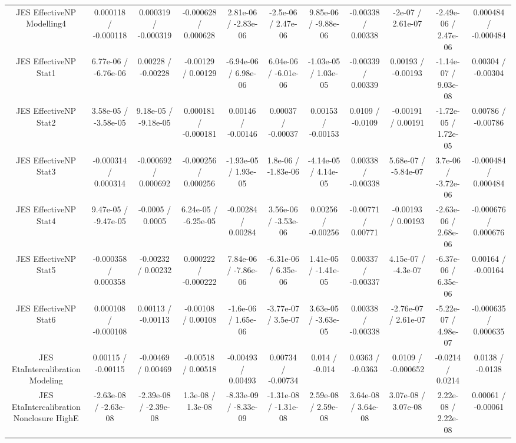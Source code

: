 \begin{table}[htbp]
\begin{center}
\begin{tabular}{|c|c|c|c|c|c|c|c|c|c|c|}
  JES EffectiveNP Modelling4 & 0.000118 / -0.000118 & 0.000319 / -0.000319 & -0.000628 / 0.000628 & 2.81e-06 / -2.83e-06 & -2.5e-06 / 2.47e-06 & 9.85e-06 / -9.88e-06 & -0.00338 / 0.00338 & -2e-07 / 2.61e-07 & -2.49e-06 / 2.47e-06 & 0.000484 / -0.000484 \\ 
  JES EffectiveNP Stat1 & 6.77e-06 / -6.76e-06 & 0.00228 / -0.00228 & -0.00129 / 0.00129 & -6.94e-06 / 6.98e-06 & 6.04e-06 / -6.01e-06 & -1.03e-05 / 1.03e-05 & -0.00339 / 0.00339 & 0.00193 / -0.00193 & -1.14e-07 / 9.03e-08 & 0.00304 / -0.00304 \\ 
  JES EffectiveNP Stat2 & 3.58e-05 / -3.58e-05 & 9.18e-05 / -9.18e-05 & 0.000181 / -0.000181 & 0.00146 / -0.00146 & 0.00037 / -0.00037 & 0.00153 / -0.00153 & 0.0109 / -0.0109 & -0.00191 / 0.00191 & -1.72e-05 / 1.72e-05 & 0.00786 / -0.00786 \\ 
  JES EffectiveNP Stat3 & -0.000314 / 0.000314 & -0.000692 / 0.000692 & -0.000256 / 0.000256 & -1.93e-05 / 1.93e-05 & 1.8e-06 / -1.83e-06 & -4.14e-05 / 4.14e-05 & 0.00338 / -0.00338 & 5.68e-07 / -5.84e-07 & 3.7e-06 / -3.72e-06 & -0.000484 / 0.000484 \\ 
  JES EffectiveNP Stat4 & 9.47e-05 / -9.47e-05 & -0.0005 / 0.0005 & 6.24e-05 / -6.25e-05 & -0.00284 / 0.00284 & 3.56e-06 / -3.53e-06 & 0.00256 / -0.00256 & -0.00771 / 0.00771 & -0.00193 / 0.00193 & -2.63e-06 / 2.68e-06 & -0.000676 / 0.000676 \\ 
  JES EffectiveNP Stat5 & -0.000358 / 0.000358 & -0.00232 / 0.00232 & 0.000222 / -0.000222 & 7.84e-06 / -7.86e-06 & -6.31e-06 / 6.35e-06 & 1.41e-05 / -1.41e-05 & 0.00337 / -0.00337 & 4.15e-07 / -4.3e-07 & -6.37e-06 / 6.35e-06 & 0.00164 / -0.00164 \\ 
  JES EffectiveNP Stat6 & 0.000108 / -0.000108 & 0.00113 / -0.00113 & -0.00108 / 0.00108 & -1.6e-06 / 1.65e-06 & -3.77e-07 / 3.5e-07 & 3.63e-05 / -3.63e-05 & 0.00338 / -0.00338 & -2.76e-07 / 2.61e-07 & -5.22e-07 / 4.98e-07 & -0.000635 / 0.000635 \\ 
  JES EtaIntercalibration Modeling & 0.00115 / -0.00115 & -0.00469 / 0.00469 & -0.00518 / 0.00518 & -0.00493 / 0.00493 & 0.00734 / -0.00734 & 0.014 / -0.014 & 0.0363 / -0.0363 & 0.0109 / -0.000652 & -0.0214 / 0.0214 & 0.0138 / -0.0138 \\ 
  JES EtaIntercalibration Nonclosure HighE & -2.63e-08 / -2.63e-08 & -2.39e-08 / -2.39e-08 & 1.3e-08 / 1.3e-08 & -8.33e-09 / -8.33e-09 & -1.31e-08 / -1.31e-08 & 2.59e-08 / 2.59e-08 & 3.64e-08 / 3.64e-08 & 3.07e-08 / 3.07e-08 & 2.22e-08 / 2.22e-08 & 0.00061 / -0.00061 \\ 

\end{tabular}
\end{center}
\end{table}

